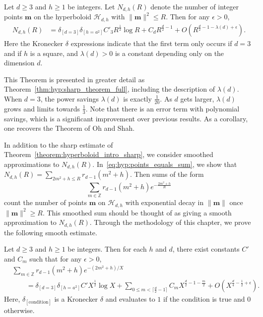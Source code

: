 \begin{theorem}\label{theorem:hyperboloid_intro_sharp}
  Let $d \geq 3$ and $h \geq 1$ be integers.
  Let $N_{d,h}(R)$ denote the number of integer points $\bm{m}$ on the hyperboloid
  $\mathcal{H}_{d,h}$ with $\| \bm{m} \|^2 \leq R$.
  Then for any $\epsilon > 0$,
  \begin{align}
    N_{d,h}(R) &= \delta_{[d = 3]} \delta_{[h = a^2]} C'_3 R^{\frac{1}{2}} \log R + C_d
    R^{\frac{d}{2} - 1} + O(R^{\frac{d}{2} - 1 - \lambda(d) + \epsilon}).
  \end{align}
  Here the Kronecker $\delta$ expressions indicate that the first term only occurs if $d =
  3$ and if $h$ is a square, and $\lambda(d) > 0$ is a constant depending only on the
  dimension $d$.
\end{theorem}


This Theorem is presented in greater detail as Theorem~\ref{thm:hyp:sharp_theorem_full},
including the description of $\lambda(d)$.
When $d = 3$, the power savings $\lambda(d)$ is exactly $\frac{1}{20}$.
As $d$ gets larger, $\lambda(d)$ grows and limits towards $\frac{1}{3}$.
Note that there is an error term with polynomial savings, which is a significant
improvement over previous results.
As a corollary, one recovers the Theorem of Oh and Shah.

In addition to the sharp estimate of Theorem~\ref{theorem:hyperboloid_intro_sharp}, we
consider smoothed approximations to $N_{d,h}(R)$.
In~\eqref{eq:hyp:points_equals_sum}, we show that $N_{d,h}(R) = \sum_{2m^2+h \leq R}
r_{d-1}(m^2 + h)$.
Then sums of the form
\begin{equation}
  \sum_{m \in \mathbb{Z}} r_{d-1}(m^2 + h) e^{-\frac{2m^2 + h}{R}}
\end{equation}
count the number of points $\bm{m}$ on $\mathcal{H}_{d,h}$ with exponential decay in $\|
\bm{m} \|$ once $\| \bm{m} \|^2 \geq R$.
This smoothed sum should be thought of as giving a smooth approximation to $N_{d,h}(R)$.
Through the methodology of this chapter, we prove the following smooth estimate.


\begin{theorem}\label{theorem:hyperboloid_intro_smooth}
  Let $d \geq 3$ and $h \geq 1$ be integers.
  Then for each $h$ and $d$, there exist constants $C'$ and $C_m$ such that for any
  $\epsilon > 0$,
  \begin{align}
    &\sum_{m \in \mathbb{Z}} r_{d-1}(m^2 + h) e^{-(2m^2 + h)/X} \\
    &\qquad = \delta_{[d=3]} \delta_{[h = a^2]} C' X^{\frac{1}{2}} \log X + \sum_{0 \leq m
    < \lceil \frac{d}{2} - 1 \rceil} C_{m} X^{\frac{d}{2} - 1 -\frac{m}{2}}
    + O(X^{\frac{d}{4} - \frac{1}{2} + \epsilon}).
  \end{align}
  Here, $\delta_{[\text{condition}]}$ is a Kronecker $\delta$ and evaluates to $1$ if the
  condition is true and $0$ otherwise.
\end{theorem}



